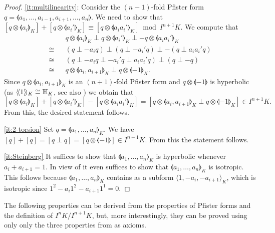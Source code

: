 \documentclass[12pt, leqno, british]{amsart}
\begin{document}
\begin{proof}
\eqref{it:multilinearity}: 
Consider the $(n-1)$-fold Pfister form $q = \llangle a_1, \ldots, a_{i-1}, a_{i+1}, \ldots, a_n \rrangle$.
We need to show that $[q \otimes \llangle a_i \rrangle_K] + [q \otimes \llangle a_i' \rrangle_K] \equiv [q \otimes \llangle a_ia_i' \rrangle_K] \bmod I^{n+1}K$.
We compute that
\begin{eqnarray*}
&&q \otimes \llangle a_i \rrangle_K \perp q \otimes \llangle a_i' \rrangle_K \perp -q \otimes \llangle a_ia_i' \rrangle_K \\
\cong && (q \perp -a_iq) \perp (q \perp -a_i'q) \perp -(q \perp a_ia_i'q) \\
\cong && (q \perp -a_iq \perp -a_i'q \perp a_ia_i'q) \perp (q \perp -q) \\
\cong &&q \otimes \llangle a_i, a_{i+1} \rrangle_K \perp q \otimes \llangle -1 \rrangle_K.
\end{eqnarray*}
Since $q \otimes \llangle a_i, a_{i+1} \rrangle_K$ is an $(n+1)$-fold Pfister form and $q \otimes \llangle -1 \rrangle$ is hyperbolic (as $\langle\!\langle 1 \rangle\!\rangle_K \cong \mathbb{H}_K$, see also )
we obtain that $$[q \otimes \llangle a_i \rrangle_K] + [q \otimes \llangle a_i' \rrangle_K] - [q \otimes \llangle a_ia_i' \rrangle_K] = [q \otimes \llangle a_i, a_{i+1} \rrangle_K \perp q \otimes \llangle -1 \rrangle_K] \in I^{n+1}K.$$
From this, the desired statement follows.

\eqref{it:2-torsion}
Set $q = \llangle a_1, \ldots, a_n \rrangle_K$.
We have $[q] + [q] = [q \perp q] = [q \otimes \llangle -1 \rrangle] \in I^{n+1}K$.
From this the statement follows.

\eqref{it:Steinberg} It suffices to show that $\llangle a_1, \ldots, a_n \rrangle_K$ is hyperbolic whenever $a_i + a_{i+1} = 1$.
In view of  it even suffices to show that $\llangle a_1, \ldots, a_n \rrangle_K$ is isotropic.
This follows because $\llangle a_1, \ldots, a_n \rrangle_K$ contains as a subform $\langle 1, -a_i, -a_{i+1} \rangle_K$, which is isotropic since $1^2 - a_i1^2 - a_{i+1}1^1 = 0$.
\end{proof}
The following properties can be derived from the properties of Pfister forms and the definition of $I^nK/I^{n+1}K$, but, more interestingly, they can be proved using only only the three properties from  as axioms.
\end{document}
